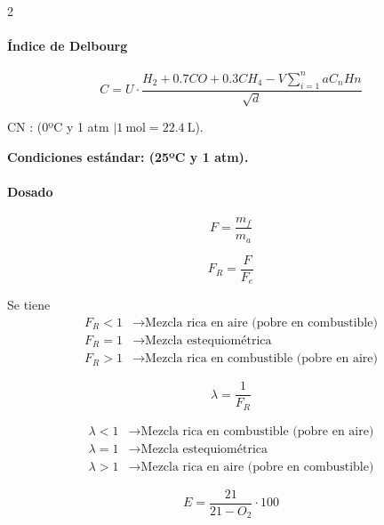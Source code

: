 \documentclass[11pt]{article}
\begin{document}
\begin{multicols*}{2}
    \paragraph*{Índice de Delbourg}
    \begin{equation}
        C = U \cdot \frac{H_2 + 0.7CO + 0.3CH_4 - V\sum_{i=1}^{n}{aC_{n}H{n}}}{\sqrt{d}}
    \end{equation}

    CN : (0ºC y 1 atm  $ \mid 1 \ \mathrm{mol} = 22.4 \ \mathrm{L}$).
    
    \textbf{Condiciones estándar: (25ºC y 1 atm).}

    \paragraph*{Dosado}

    \begin{equation}
        F = \frac{m_f}{m_a}
    \end{equation}

    \begin{equation}
        F_R = \frac{F}{F_{e}}
    \end{equation}

    Se tiene 
    \begin{align*}
        F_{R} < 1 &\rightarrow \text{Mezcla rica en aire (pobre en combustible)} \\
        F_{R} = 1 &\rightarrow \text{Mezcla estequiométrica} \\
        F_{R} > 1 &\rightarrow \text{Mezcla rica en combustible (pobre en aire)}
    \end{align*}

    \begin{equation}
        \lambda = \frac{1}{F_R}
    \end{equation}

    \begin{align*}
        \lambda < 1 &\rightarrow \text{Mezcla rica en combustible (pobre en aire)} \\
        \lambda = 1 &\rightarrow \text{Mezcla estequiométrica} \\
        \lambda > 1 &\rightarrow \text{Mezcla rica en aire (pobre en combustible)}
    \end{align*}

    \begin{equation}
        E = \frac{21}{21 - O_2} \cdot 100
    \end{equation}


\end{multicols*}
\end{document}
